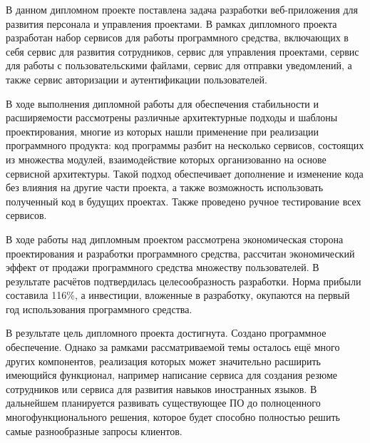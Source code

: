 
В данном дипломном проекте поставлена задача разработки веб-приложения для развития персонала и управления проектами. В рамках дипломного проекта разработан набор сервисов для работы программного средства, включающих в себя сервис для развития сотрудников, сервис для управления проектами, сервис для работы с пользовательскими файлами, сервис для отправки уведомлений, а также сервис авторизации и аутентификации пользователей.

В ходе выполнения дипломной работы для обеспечения стабильности и расширяемости рассмотрены различные архитектурные подходы и шаблоны проектирования, многие из которых нашли применение при реализации программного продукта: код программы разбит на несколько сервисов, состоящих из множества модулей, взаимодействие которых организованно на основе сервисной архитектуры. Такой подход обеспечивает дополнение и изменение кода без влияния на другие части проекта, а также возможность использовать полученный код в будущих проектах. Также проведено ручное тестирование всех сервисов.

В ходе работы над дипломным проектом рассмотрена экономическая сторона проектирования и разработки программного средства, рассчитан экономический эффект от продажи программного средства множеству пользователей. В результате расчётов подтвердилась целесообразность разработки. Норма прибыли составила 116\%, а инвестиции, вложенные в разработку, окупаются на первый год использования программного средства.

В результате цель дипломного проекта достигнута. Создано программное обеспечение. Однако за рамками рассматриваемой темы осталось ещё много других компонентов, реализация которых может значительно расширить имеющийся функционал, например написание сервиса для создания резюме сотрудников или сервиса для развития навыков иностранных языков. В дальнейшем планируется развивать существующее ПО до полноценного многофункционального решения, которое будет способно полностью решить самые разнообразные запросы клиентов.
